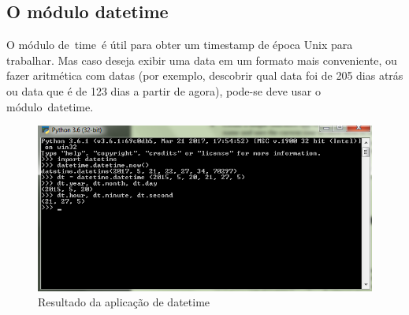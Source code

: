 \documentclass[12pt, a4paper, twocolumn]{article}
\begin{document}
\subsection{O módulo datetime}
O módulo de time é útil para obter um timestamp de época Unix para trabalhar. Mas caso deseja exibir uma data em um formato mais conveniente, ou fazer aritmética com datas (por exemplo, descobrir qual data foi de 205 dias atrás ou data que é de 123 dias a partir de agora), pode-se deve usar o módulo datetime.
\begin{figure}[htb!]
	\centering
	\includegraphics[scale = 0.45]{datetime.png}
	\caption{Resultado da aplicação de datetime }
\end{figure}
\end{document}
